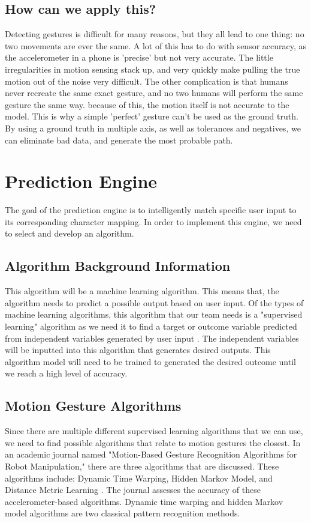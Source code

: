 \documentclass[onecolumn, draftclsnofoot,10pt, journal, letterpaper]{IEEEtran}
\begin{document}
    \subsection{How can we apply this?}
        Detecting gestures is difficult for many reasons, but they all lead to one thing: no two movements are ever the same. A lot of this has to do with sensor accuracy, as the accelerometer in a phone is 'precise' but not very accurate. The little irregularities in motion sensing stack up, and very quickly make pulling the true motion out of the noise very difficult. The other complication is that humans never recreate the same exact gesture, and no two humans will perform the same gesture the same way. because of this, the motion itself is not accurate to the model. This is why a simple 'perfect' gesture can't be used as the ground truth. By using a ground truth in multiple axis, as well as tolerances and negatives, we can eliminate bad data, and generate the most probable path.

\section{Prediction Engine}
    The goal of the prediction engine is to intelligently match specific user input to its corresponding character mapping. In order to implement this engine, we need to select and develop an algorithm. 
    
    \subsection{Algorithm Background Information}
        This algorithm will be a machine learning algorithm. This means that, the algorithm needs to predict a possible output based on user input. Of the types of machine learning algorithms, this algorithm that our team needs is a "supervised learning" algorithm as we need it to find a target or outcome variable predicted from independent variables generated by user input \cite{rayEssentialsMachineLearning2017}. The independent variables will be inputted into this algorithm that generates desired outputs. This algorithm model will need to be trained to generated the desired outcome until we reach a high level of accuracy. 
    
    \subsection{Motion Gesture Algorithms}
        Since there are multiple different supervised learning algorithms that we can use, we need to find possible algorithms that relate to motion gestures the closest. In an academic journal named "Motion-Based Gesture Recognition Algorithms for Robot Manipulation," there are three algorithms that are discussed. These algorithms include: Dynamic Time Warping, Hidden Markov Model, and Distance Metric Learning \cite{teamarasovicMotionBasedGestureRecognition2015}. The journal assesses the accuracy of these accelerometer-based algorithms. Dynamic time warping and hidden Markov model algorithms are two classical pattern recognition methods. 
    
\end{document}
